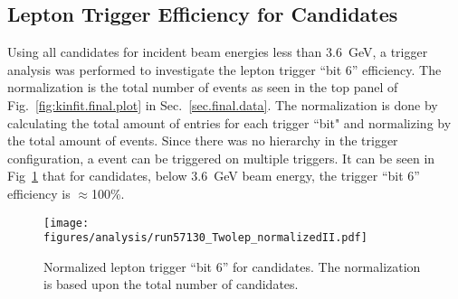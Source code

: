 \subsection{Lepton Trigger Efficiency for \pizT Candidates}\label{sec:analysis.trigger.verify}
	Using all \pizT candidates for incident beam energies less than 3.6~GeV, a trigger analysis was performed to investigate the lepton trigger ``bit 6'' efficiency. The normalization is the total number of \pizT events as seen in the top panel of Fig.~\ref{fig:kinfit.final.plot} in Sec.~\ref{sec.final.data}. The normalization is done by calculating the total amount of entries for each trigger ``bit" and normalizing by the total amount of events. Since there was no hierarchy in the trigger configuration, a event can be triggered on multiple triggers. It can be seen in Fig~\ref{fig:Leptrigger} that for \pizT candidates, below 3.6~GeV beam energy, the trigger ``bit 6'' efficiency is $\approx$100\%.
							
	\begin{figure}[h!]\begin{center}
		\texttt{[image: \\figures/analysis/run57130\_Twolep\_normalizedII.pdf]}
		\caption[Normalized Lepton Trigger ``Bit 6'' for \piz candidates]{\label{fig:Leptrigger}Normalized lepton trigger ``bit 6'' for \pizT candidates. The normalization is based upon the total number of \pizT candidates.}
	\end{center}\end{figure} 